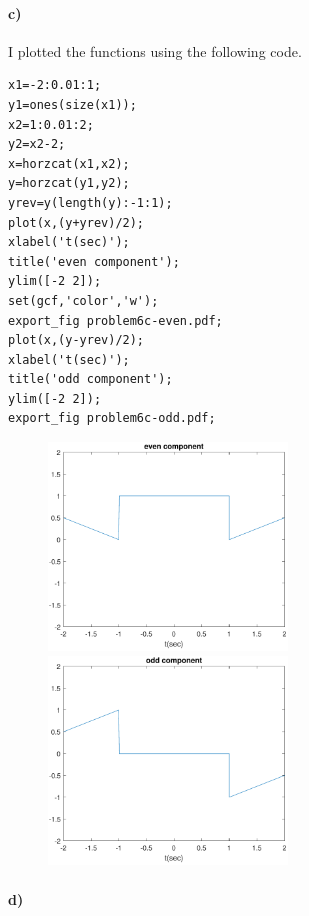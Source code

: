 \documentclass[12pt]{article}
\begin{document}
\paragraph{c)}

I plotted the functions using the following code.
\begin{verbatim}
x1=-2:0.01:1;
y1=ones(size(x1));
x2=1:0.01:2;
y2=x2-2;
x=horzcat(x1,x2);
y=horzcat(y1,y2);
yrev=y(length(y):-1:1);
plot(x,(y+yrev)/2);
xlabel('t(sec)');
title('even component');
ylim([-2 2]);
set(gcf,'color','w');
export_fig problem6c-even.pdf;
plot(x,(y-yrev)/2);
xlabel('t(sec)');
title('odd component');
ylim([-2 2]);
export_fig problem6c-odd.pdf;
\end{verbatim}
\begin{figure}[H]
    \begin{center}
        \includegraphics[width=2.5in]{problem6c-even.pdf}
        \includegraphics[width=2.5in]{problem6c-odd.pdf}
    \end{center}
\end{figure}

\paragraph{d)}
\end{document}
